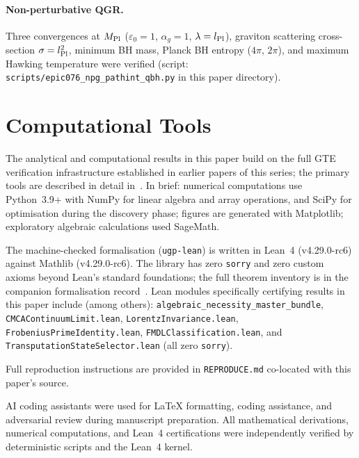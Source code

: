 \documentclass[11pt]{article}
\theoremstyle{remark}
\newcommand{\epsz}{\varepsilon_0}
\begin{document}
\begin{appendices}
\paragraph{Non-perturbative QGR.}
Three convergences at $M_{\rm Pl}$ ($\epsz=1$, $\alpha_g=1$, $\lambda=l_{\rm Pl}$),
graviton scattering cross-section $\sigma=l_{\rm Pl}^2$,
minimum BH mass, Planck BH entropy ($4\pi$, $2\pi$), and maximum Hawking
temperature were verified (script:
\texttt{scripts/epic076\_npg\_pathint\_qbh.py} in this paper directory).

\end{appendices}

\section*{Computational Tools}

The analytical and computational results in this paper build on the full GTE
verification infrastructure established in earlier papers of this series; the
primary tools are described in detail in~\cite{Spivack2026_SM_UGP}.  In brief:
numerical computations use Python~3.9+ with NumPy for linear algebra and array
operations, and SciPy for optimisation during the discovery phase; figures are
generated with Matplotlib; exploratory algebraic calculations used SageMath.

The machine-checked formalisation (\texttt{ugp-lean}) is written in Lean~4
(v4.29.0-rc6) against Mathlib (v4.29.0-rc6).  The library has zero
\texttt{sorry} and zero custom axioms beyond Lean's standard foundations; the
full theorem inventory is in the companion formalisation
record~\cite{SpivackUGPPhysicsLean}.  Lean modules specifically certifying
results in this paper include (among others):
\texttt{algebraic\_necessity\_master\_bundle},
\texttt{CMCAContinuumLimit.lean}, \texttt{LorentzInvariance.lean},
\texttt{FrobeniusPrimeIdentity.lean}, \texttt{FMDLClassification.lean}, and
\texttt{TransputationStateSelector.lean} (all zero \texttt{sorry}).

Full reproduction instructions are provided in \texttt{REPRODUCE.md} co-located with this paper's source.

AI coding assistants were used for LaTeX formatting, coding assistance, and adversarial review during manuscript preparation. All mathematical derivations, numerical computations, and Lean~4 certifications were independently verified by deterministic scripts and the Lean~4 kernel.



\end{document}
